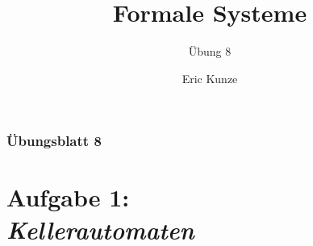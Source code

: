 \documentclass{beamer}
\begin{document}
	
	\title{Formale Systeme}
	\subtitle{Übung 8}
	\author{Eric Kunze}
	\date{}

	\maketitle

%	

	\begin{frame} \frametitle{Übungsblatt 8}
		\tableofcontents
	\end{frame}

	\section{Aufgabe 1: \\ \itshape Kellerautomaten}
\end{document}
